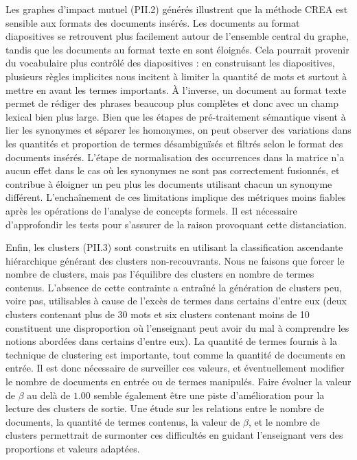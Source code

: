 \bigskip

Les graphes d'impact mutuel (PII.2) générés illustrent que la méthode CREA est sensible aux formats des documents insérés.
Les documents au format diapositives se retrouvent plus facilement autour de l'ensemble central du graphe, tandis que les documents au format texte en sont éloignés.
Cela pourrait provenir du vocabulaire plus contrôlé des diapositives : en construisant les diapositives, plusieurs règles implicites nous incitent à limiter la quantité de mots et surtout à mettre en avant les termes importants.
À l'inverse, un document au format texte permet de rédiger des phrases beaucoup plus complètes et donc avec un champ lexical bien plus large.
Bien que les étapes de pré-traitement sémantique visent à lier les synonymes et séparer les homonymes, on peut observer des variations dans les quantités et proportion de termes désambiguïsés et filtrés selon le format des documents insérés.
L'étape de normalisation des occurrences dans la matrice n'a aucun effet dans le cas où les synonymes ne sont pas correctement fusionnés, et contribue à éloigner un peu plus les documents utilisant chacun un synonyme différent.
L'enchaînement de ces limitations implique des métriques moins fiables après les opérations de l'analyse de concepts formels.
Il est nécessaire d'approfondir les tests pour s'assurer de la raison provoquant cette distanciation.

\bigskip

Enfin, les clusters (PII.3) sont construits en utilisant la classification ascendante hiérarchique générant des clusters non-recouvrants.
Nous ne faisons que forcer le nombre de clusters, mais pas l'équilibre des clusters en nombre de termes contenus.
L'absence de cette contrainte a entraîné la génération de clusters peu, voire pas, utilisables à cause de l'excès de termes dans certains d'entre eux (deux clusters contenant plus de 30 mots et six clusters contenant moins de 10 constituent une disproportion où l'enseignant peut avoir du mal à comprendre les notions abordées dans certains d'entre eux).
La quantité de termes fournis à la technique de clustering est importante, tout comme la quantité de documents en entrée.
Il est donc nécessaire de surveiller ces valeurs, et éventuellement modifier le nombre de documents en entrée ou de termes manipulés.
Faire évoluer la valeur de $ \beta $ au delà de $ 1.00 $ semble également être une piste d'amélioration pour la lecture des clusters de sortie.
Une étude sur les relations entre le nombre de documents, la quantité de termes contenus, la valeur de $ \beta $, et le nombre de clusters permettrait de surmonter ces difficultés en guidant l'enseignant vers des proportions et valeurs adaptées.





